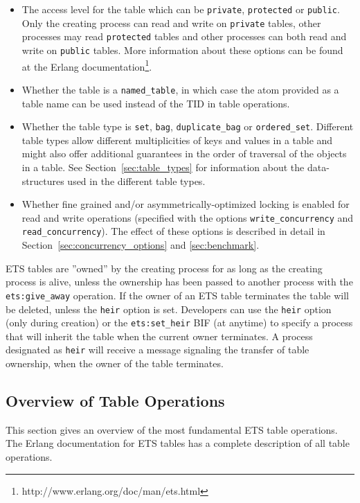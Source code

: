 \documentclass[aps,pre,preprint,nofootinbib]{revtex4}
\begin{document}
\begin{itemize}
\item
  The access level for the table which can be \verb|private|, \verb|protected| or \verb|public|.
  Only the creating process can read and write on \verb|private| tables, other processes may read \verb|protected| tables and other processes can both read and write on \verb|public| tables.
  More information about these options can be found at the Erlang documentation\footnote{http://www.erlang.org/doc/man/ets.html}.
\item
  Whether the table is a \verb|named_table|, in which case the atom provided as a table name can be used instead of the TID in table operations.
\item
  Whether the table type is \verb|set|, \verb|bag|, \verb|duplicate_bag| or \verb|ordered_set|.
  Different table types allow different multiplicities of keys and values in a table and might also offer additional guarantees in the order of traversal of the objects in a table.
  See Section~\ref{sec:table_types} for information about the data-structures used in the different table types.
\item
  Whether fine grained and/or asymmetrically-optimized locking is enabled for read and write operations (specified with the options \verb|write_concurrency| and \verb|read_concurrency|).
  The effect of these options is described in detail in Section~\ref{sec:concurrency_options} and \ref{sec:benchmark}.
\end{itemize}

ETS tables are ''owned'' by the creating process for as long as the creating process is alive, unless the ownership has been passed to another process with the \verb|ets:give_away| operation.
If the owner of an ETS table terminates the table will be deleted, unless the \verb|heir| option is set.
Developers can use the \verb|heir| option (only during creation) or the \verb|ets:set_heir| BIF (at anytime) to specify a process that will inherit the table when the current owner terminates.
A process designated as \verb|heir| will receive a message signaling the transfer of table ownership, when the owner of the table terminates.

\subsection{Overview of Table Operations}

This section gives an overview of the most fundamental ETS table operations.
The Erlang documentation for ETS tables has a complete description of all table operations.
\end{document}
